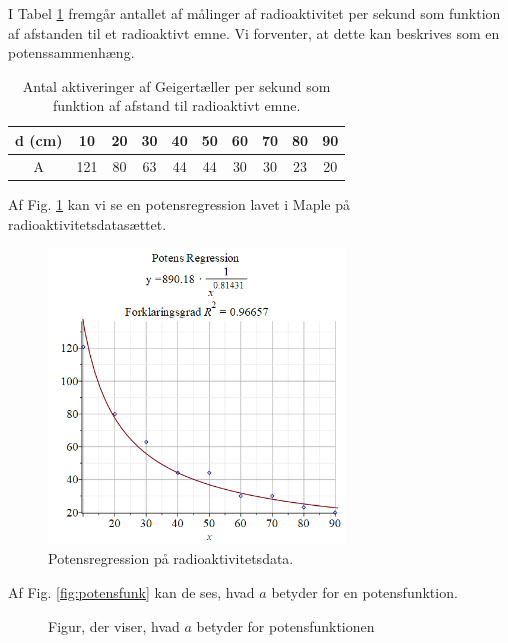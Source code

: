 \begin{exa}\label{exa:radio}
I Tabel \ref{tab:radio} fremgår antallet af målinger af radioaktivitet per sekund som funktion af afstanden til et radioaktivt emne. Vi forventer, at dette kan beskrives som en potenssammenhæng. 
\begin{table}[H]
\center
\begin{tabular}{c|c|c|c|c|c|c|c|c|c}
d (cm) & 10 & 20 & 30 & 40 & 50 & 60 & 70 & 80 & 90\\ \hline
A & 121 & 80 & 63 & 44 & 44 & 30 & 30 & 23 & 20 
\end{tabular}
\caption{Antal aktiveringer af Geigertæller per sekund som funktion af afstand til radioaktivt emne.}
\label{tab:radio}
\end{table}
Af Fig. \ref{fig:potensreg} kan vi se en potensregression lavet i Maple på radioaktivitetsdatasættet. 
\begin{figure}[H]
	\centering
	\includegraphics[width=0.7\textwidth]{Billeder/potensreg.png}
	\caption{Potensregression på radioaktivitetsdata.}
	\label{fig:potensreg}
\end{figure}
\end{exa}
Af Fig. \ref{fig:potensfunk} kan de ses, hvad $a$ betyder for en potensfunktion.
\begin{figure}[H]
\centering
{}
\caption{Figur, der viser, hvad $a$ betyder for potensfunktionen}
\end{figure}

